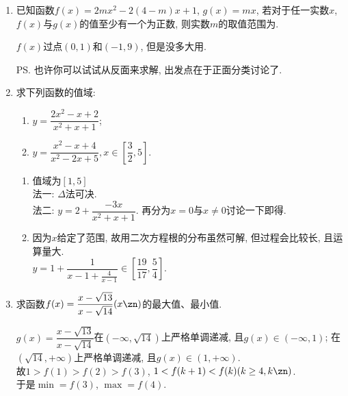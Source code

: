 \begin{enumerate}
\item 已知函数$f(x)=2mx^2-2(4-m)x+1$, $g(x)=mx$, 若对于任一实数$x$, $f(x)$与$g(x)$的值至少有一个为正数, 则实数$m$的取值范围为.
\begin{jieda}
$f(x)$过点$(0,1)$和$(-1,9)$, 但是没多大用.
\ps 也许你可以试试从反面来求解, 出发点在于正面分类讨论了. 
\end{jieda}


\item 求下列函数的值域: 
\begin{enumerate}[(1)]
\item $y=\dfrac{2x^2-x+2}{x^2+x+1}$; 
\item $y=\dfrac{x^2-x+4}{x^2-2x+5},x\in[\dfrac{3}{2},5]$. 
\end{enumerate}
\begin{jieda}
\begin{enumerate}[(1)]
\item 值域为$[1, 5]$ \\
法一: $\Delta$法可决. \\
法二: $y=2+\dfrac{-3x}{x^2+x+1}$. 再分为$x=0$与$x\neq 0$讨论一下即得. 

\item 因为$x$给定了范围, 故用二次方程根的分布虽然可解, 但过程会比较长, 且运算量大. \\
$y=1+\dfrac{1}{x-1+\frac{4}{x-1}}\in\left[\dfrac{19}{17},\dfrac{5}{4}\right]$. 
\end{enumerate}
\end{jieda}
\begin{vspace_}
\vsp[5]
\end{vspace_}

\item 求函数$f(x)=\dfrac{x-\sqrt{13}}{x-\sqrt{14}}(x\zn)$的最大值、最小值. 
\begin{jieda}
$g(x)=\dfrac{x-\sqrt{13}}{x-\sqrt{14}}$在$(-\infty,\sqrt{14})$上严格单调递减, 且$g(x)\in(-\infty,1)$; 
在$(\sqrt{14},+\infty)$上严格单调递减, 且$g(x)\in(1,+\infty)$. \\
故$1>f(1)>f(2)>f(3)$, $1<f(k+1)<f(k)(k\geq4,k\zn)$. \\
于是$\min=f(3)$, $\max=f(4)$. 
\end{jieda}
\begin{vspace_}
\vsp[5]
\end{vspace_}


\end{enumerate}
